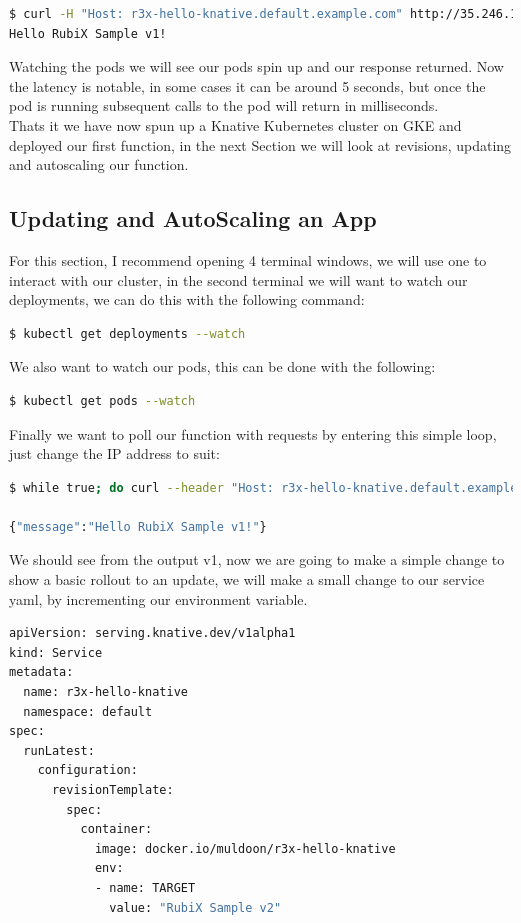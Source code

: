 \begin{lstlisting}[language=bash]
$ curl -H "Host: r3x-hello-knative.default.example.com" http://35.246.108.94
Hello RubiX Sample v1!
\end{lstlisting}
Watching the pods we will see our pods spin up and our response returned. Now the latency is notable, in some cases it can be around 5 seconds, but once the pod is running subsequent calls to the pod will return in milliseconds.
\\Thats it we have now spun up a Knative Kubernetes cluster on GKE and deployed our first function, in the next Section we will look at revisions, updating and autoscaling our function.

\subsection{Updating and AutoScaling an App}
For this section, I recommend opening 4 terminal windows, we will use one to interact with our cluster, in the second terminal we will want to watch our deployments, we can do this with the following command:
\begin{lstlisting}[language=bash]
$ kubectl get deployments --watch
\end{lstlisting}
We also want to watch our pods, this can be done with the following:
\begin{lstlisting}[language=bash]
$ kubectl get pods --watch
\end{lstlisting}
Finally we want to poll our function with requests by entering this simple loop, just change the IP address to suit:
\begin{lstlisting}[language=bash]
$ while true; do curl --header "Host: r3x-hello-knative.default.example.com" http://35.246.108.94;done

{"message":"Hello RubiX Sample v1!"}
\end{lstlisting}
We should see from the output v1, now we are going to make a simple change to show a basic rollout to an update, we will make a small change to our service yaml, by incrementing our environment variable.
\begin{lstlisting}[language=bash]
apiVersion: serving.knative.dev/v1alpha1
kind: Service
metadata:
  name: r3x-hello-knative
  namespace: default
spec:
  runLatest:
    configuration:
      revisionTemplate:
        spec:
          container:
            image: docker.io/muldoon/r3x-hello-knative
            env:
            - name: TARGET
              value: "RubiX Sample v2"
\end{lstlisting}
